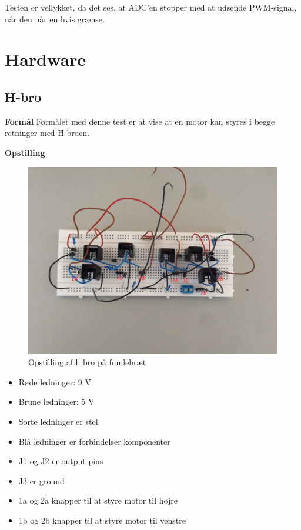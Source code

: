 Testen er vellykket, da det ses, at ADC'en stopper med at udsende PWM-signal, når den når en hvis grænse. 

\section{Hardware}
\subsection{H-bro} 

\textbf{Formål} \newline
Formålet med denne test er at vise at en motor kan styres i begge retninger med H-broen.\newline

\noindent \textbf{Opstilling}

\begin{figure}[H]
	\centering
	\includegraphics[width=\textwidth]{test/images/testhbroopst}
	\caption{Opstilling af h bro på fumlebræt}
\end{figure}

\begin{itemize}
	\item 	Røde ledninger: 9 V
	\item	Brune ledninger: 5 V
	\item	Sorte ledninger er stel
	\item	Blå ledninger er forbindelser komponenter
	\item	J1 og J2 er output pins 
	\item	J3 er ground
	\item	1a og 2a knapper til at styre motor til højre
	\item	1b og 2b knapper til at styre motor til venstre 	
\end{itemize}

